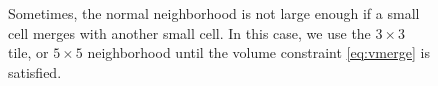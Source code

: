 \begin{itemize}
\begin{figure}
	\hfill
	\caption{Sometimes, the normal neighborhood is not large enough if a small cell merges with another small cell.  In this case, we use the $3\times 3$ tile, or $5\times5$ neighborhood until the volume constraint \eqref{eq:vmerge} is satisfied.}
\end{figure}


\end{itemize}
